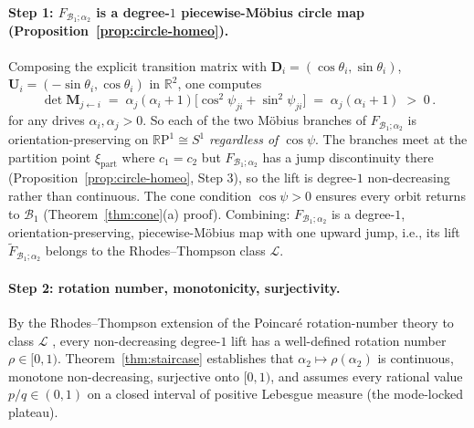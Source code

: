 \documentclass[12pt]{article}
\newcommand{\vv}[1]{\mathbf{#1}}
\newcommand{\DD}{\vv{D}}
\newcommand{\RR}{\mathbb{R}}
\newcommand{\Bsp}{\mathcal{B}}
\begin{document}
\paragraph{Step 1: $F_{\!\Bsp_1;\alpha_2}$ is a degree-$1$ piecewise-M\"obius circle map (Proposition~\ref{prop:circle-homeo}).}
Composing the explicit transition matrix with $\DD_i=(\cos\theta_i,\sin\theta_i)$, $\vv{U}_i=(-\sin\theta_i,\cos\theta_i)$ in $\RR^2$, one computes
\begin{equation}
    \det \vv{M}_{j\leftarrow i} \;=\; \alpha_j(\alpha_i+1)\bigl[\cos^2\psi_{ji} + \sin^2\psi_{ji}\bigr] \;=\; \alpha_j(\alpha_i+1) \;>\; 0\,.
\end{equation}
for any drives $\alpha_i,\alpha_j>0$. So each of the two M\"obius branches of $F_{\!\Bsp_1;\alpha_2}$ is orientation-preserving on $\mathbb{R}\mathrm{P}^1\cong S^1$ \emph{regardless of $\cos\psi$}. The branches meet at the partition point $\xi_{\mathrm{part}}$ where $c_1=c_2$ but $F_{\!\Bsp_1;\alpha_2}$ has a jump discontinuity there (Proposition~\ref{prop:circle-homeo}, Step 3), so the lift is degree-$1$ non-decreasing rather than continuous. The cone condition $\cos\psi>0$ ensures every orbit returns to $\Bsp_1$ (Theorem~\ref{thm:cone}(a) proof). Combining: $F_{\!\Bsp_1;\alpha_2}$ is a degree-$1$, orientation-preserving, piecewise-M\"obius map with one upward jump, i.e., its lift $\widetilde F_{\!\Bsp_1;\alpha_2}$ belongs to the Rhodes--Thompson class $\mathcal{L}$.

\paragraph{Step 2: rotation number, monotonicity, surjectivity.}
By the Rhodes--Thompson extension of the Poincar\'e rotation-number theory to class $\mathcal{L}$ \citep{rhodes1991topologies,alseda2000combinatorial,poincare1885courbes,herman1979conjugaison}, every non-decreasing degree-$1$ lift has a well-defined rotation number $\rho\in[0,1)$. Theorem~\ref{thm:staircase} establishes that $\alpha_2\mapsto\rho(\alpha_2)$ is continuous, monotone non-decreasing, surjective onto $[0,1)$, and assumes every rational value $p/q\in(0,1)$ on a closed interval of positive Lebesgue measure (the mode-locked plateau).
\end{document}
